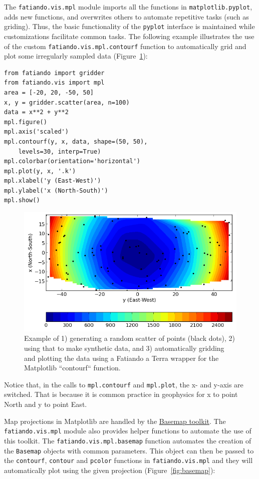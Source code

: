 The \texttt{fatiando.vis.mpl} module imports all the functions in
\texttt{matplotlib.pyplot}, adds new functions, and overwrites others to
automate repetitive tasks (such as griding). Thus, the basic
functionality of the \texttt{pyplot} interface is maintained while
customizations facilitate common tasks. The following example
illustrates the use of the custom \texttt{fatiando.vis.mpl.contourf}
function to automatically grid and plot some irregularly sampled data
(Figure~\ref{fig:contourf}):

\begin{verbatim}
from fatiando import gridder
from fatiando.vis import mpl
area = [-20, 20, -50, 50]
x, y = gridder.scatter(area, n=100)
data = x**2 + y**2
mpl.figure()
mpl.axis('scaled')
mpl.contourf(y, x, data, shape=(50, 50),
    levels=30, interp=True)
mpl.colorbar(orientation='horizontal')
mpl.plot(y, x, '.k')
mpl.xlabel('y (East-West)')
mpl.ylabel('x (North-South)')
mpl.show()
\end{verbatim}


\begin{figure}
    \centering
    \includegraphics[width=\textwidth]{figures/paper1/gridding_plotting_contourf}
    \caption{
    Example of 1) generating a random scatter of points (black dots),
    2) using that to make synthetic data, and
    3) automatically gridding and plotting the data using a
    Fatiando a Terra wrapper for the Matplotlib ``contourf``
    function.
    }
    \label{fig:contourf}
\end{figure}


Notice that, in the calls to \texttt{mpl.contourf} and
\texttt{mpl.plot}, the x- and y-axis are switched. That is because it is
common practice in geophysics for x to point North and y to point East.

Map projections in Matplotlib are handled by the
\href{http://matplotlib.org/basemap}{Basemap toolkit}. The
\texttt{fatiando.vis.mpl} module also provides helper functions to
automate the use of this toolkit. The \texttt{fatiando.vis.mpl.basemap}
function automates the creation of the \texttt{Basemap} objects with
common parameters. This object can then be passed to the
\texttt{contourf}, \texttt{contour} and \texttt{pcolor} functions in
\texttt{fatiando.vis.mpl} and they will automatically plot using the
given projection (Figure~\ref{fig:basemap}):


